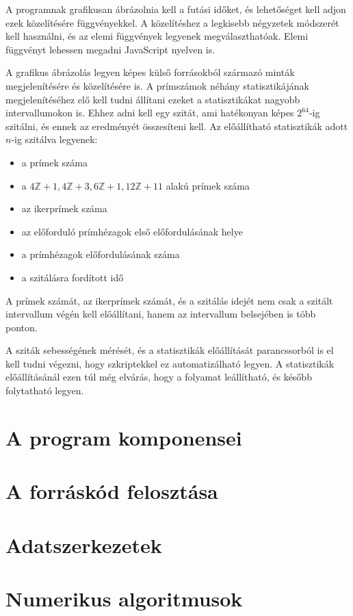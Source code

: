 \documentclass[12pt]{report}
\begin{document}
A programnak grafikusan ábrázolnia kell a futási időket, és lehetőséget kell adjon
ezek közelítésére függvényekkel. A közelítéshez a legkisebb négyzetek módszerét
kell használni, és az elemi függvények legyenek megválaszthatóak.
Elemi függvényt lehessen megadni JavaScript nyelven is.

A grafikus ábrázolás legyen képes külső forrásokból származó minták megjelenítésére
és közelítésére is. A prímszámok néhány statisztikájának megjelenítéséhez elő kell tudni
állítani ezeket a statisztikákat nagyobb intervallumokon is.
Ehhez adni kell egy szitát, ami hatékonyan képes $2^{64}$-ig szitálni,
és ennek az eredményét összesíteni kell. Az előállítható statisztikák
adott $n$-ig szitálva legyenek:
\begin{itemize}
\item a prímek száma
\item a $4\mathbb{Z}+1, 4\mathbb{Z}+3, 6\mathbb{Z}+1, 12\mathbb{Z}+11$
	alakú prímek száma
\item az ikerprímek száma
\item az előforduló prímhézagok első előfordulásának helye
\item a prímhézagok előfordulásának száma
\item a szitálásra fordított idő
\end{itemize}

A prímek számát, az ikerprímek számát, és a szitálás idejét
nem csak a szitált intervallum végén
kell előállítani, hanem az intervallum belsejében is több ponton.

A sziták sebességének mérését, és a statisztikák előállítását
parancssorból is el kell tudni végezni, hogy szkriptekkel ez automatizálható legyen.
A statisztikák előállításánál ezen túl még elvárás, hogy a folyamat leállítható,
és később folytatható legyen.

\section{A program komponensei}

\section{A forráskód felosztása}

\section{Adatszerkezetek}

\section{Numerikus algoritmusok}
\end{document}
